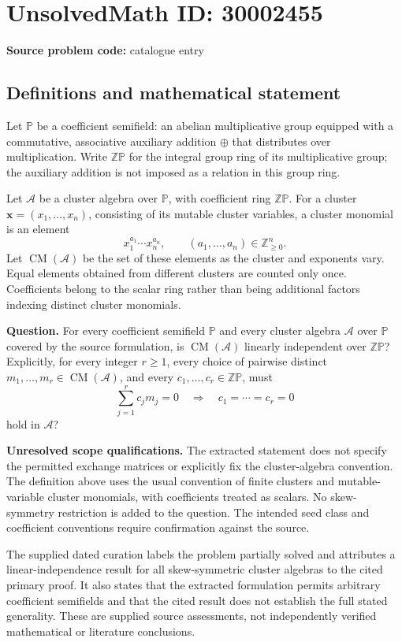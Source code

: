 \documentclass[11pt]{article}
\begin{document}
\section*{UnsolvedMath ID: 30002455}
\textbf{Source problem code:} catalogue entry
\subsection{Definitions and mathematical statement}
Let \(\mathbb P\) be a coefficient semifield: an abelian multiplicative group equipped with a commutative, associative auxiliary addition \(\oplus\) that distributes over multiplication. Write \(\mathbb Z\mathbb P\) for the integral group ring of its multiplicative group; the auxiliary addition is not imposed as a relation in this group ring.

Let \(\mathcal A\) be a cluster algebra over \(\mathbb P\), with coefficient ring \(\mathbb Z\mathbb P\). For a cluster \(\mathbf x=(x_1,\ldots,x_n)\), consisting of its mutable cluster variables, a cluster monomial is an element
\[
 x_1^{a_1}\cdots x_n^{a_n},\qquad (a_1,\ldots,a_n)\in\mathbb Z_{\geq 0}^{n}.
\]
Let \(\operatorname{CM}(\mathcal A)\) be the set of these elements as the cluster and exponents vary. Equal elements obtained from different clusters are counted only once. Coefficients belong to the scalar ring rather than being additional factors indexing distinct cluster monomials.

\textbf{Question.} For every coefficient semifield \(\mathbb P\) and every cluster algebra \(\mathcal A\) over \(\mathbb P\) covered by the source formulation, is \(\operatorname{CM}(\mathcal A)\) linearly independent over \(\mathbb Z\mathbb P\)? Explicitly, for every integer \(r\geq 1\), every choice of pairwise distinct \(m_1,\ldots,m_r\in\operatorname{CM}(\mathcal A)\), and every \(c_1,\ldots,c_r\in\mathbb Z\mathbb P\), must
\[
 \sum_{j=1}^{r}c_jm_j=0\quad\Longrightarrow\quad c_1=\cdots=c_r=0
\]
hold in \(\mathcal A\)?

\textbf{Unresolved scope qualifications.} The extracted statement does not specify the permitted exchange matrices or explicitly fix the cluster-algebra convention. The definition above uses the usual convention of finite clusters and mutable-variable cluster monomials, with coefficients treated as scalars. No skew-symmetry restriction is added to the question. The intended seed class and coefficient conventions require confirmation against the source.

The supplied dated curation labels the problem partially solved and attributes a linear-independence result for all skew-symmetric cluster algebras to the cited primary proof. It also states that the extracted formulation permits arbitrary coefficient semifields and that the cited result does not establish the full stated generality. These are supplied source assessments, not independently verified mathematical or literature conclusions.
\end{document}
